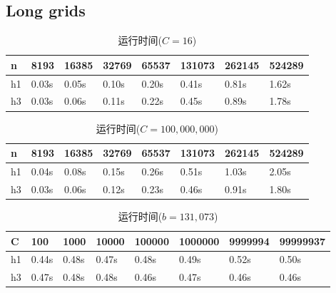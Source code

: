 \subsection{Long grids}
\begin{table}[H]
  \caption{运行时间($C=16$)}
  \label{tab22}
  \centering
  \begin{tabular}{p{1.5cm}<{\centering}p{1.5cm}<{\centering}p{1.5cm}<{\centering}p{1.5cm}<{\centering}p{1.5cm}<{\centering}p{1.5cm}<{\centering}p{1.5cm}<{\centering}p{1.5cm}<{\centering}}
  \toprule
   n & 8193 & 16385 & 32769 & 65537 & 131073 &262145 &524289\\
  \midrule
   h1  & 0.03s & 0.05s & 0.10s & 0.20s & 0.41s & 0.81s & 1.62s \\
   h3  & 0.03s & 0.06s & 0.11s & 0.22s & 0.45s & 0.89s & 1.78s \\
  \bottomrule
  \end{tabular} 
\end{table}
\begin{table}[H]
  \caption{运行时间($C=100,000,000$)}
  \label{tab23}
  \centering
  \begin{tabular}{p{1.5cm}<{\centering}p{1.5cm}<{\centering}p{1.5cm}<{\centering}p{1.5cm}<{\centering}p{1.5cm}<{\centering}p{1.5cm}<{\centering}p{1.5cm}<{\centering}p{1.5cm}<{\centering}}
  \toprule
   n & 8193 & 16385 & 32769 & 65537 & 131073 &262145 &524289\\
  \midrule
   h1  & 0.04s & 0.08s & 0.15s & 0.26s & 0.51s & 1.03s & 2.05s \\
   h3  & 0.03s & 0.06s & 0.12s & 0.23s & 0.46s & 0.91s & 1.80s \\
  \bottomrule
  \end{tabular} 
\end{table}
\begin{table}[H]
  \caption{运行时间($b=131,073$)}
  \label{tab24}
  \centering
  \begin{tabular}{p{1.3cm}<{\centering}p{1.5cm}<{\centering}p{1.5cm}<{\centering}p{1.5cm}<{\centering}p{1.5cm}<{\centering}p{1.5cm}<{\centering}p{1.5cm}<{\centering}p{1.7cm}<{\centering}}
  \toprule
   C & 100 & 1000 & 10000 & 100000 & 1000000 &9999994 & 99999937\\
  \midrule
   h1  & 0.44s & 0.48s & 0.47s & 0.48s & 0.49s & 0.52s & 0.50s \\
   h3  & 0.47s & 0.48s & 0.48s & 0.46s & 0.47s & 0.46s & 0.46s \\
  \bottomrule
  \end{tabular} 
\end{table}

